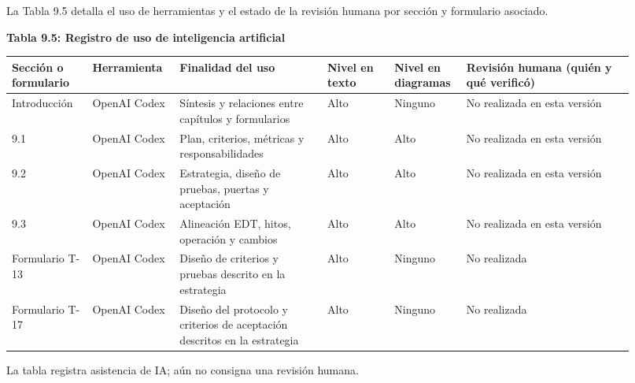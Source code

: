 \documentclass[11pt]{article}
\begin{document}
La Tabla 9.5 detalla el uso de herramientas y el estado de la revisión humana por sección y formulario asociado.

\textbf{Tabla 9.5: Registro de uso de inteligencia artificial}

\begin{longtable}{p{0.12\linewidth}p{0.13\linewidth}p{0.22\linewidth}p{0.10\linewidth}p{0.10\linewidth}p{0.25\linewidth}}
\toprule
Sección o formulario & Herramienta & Finalidad del uso & Nivel en texto & Nivel en diagramas & Revisión humana (quién y qué verificó) \\
\midrule
\endhead
Introducción & OpenAI Codex & Síntesis y relaciones entre capítulos y formularios & Alto & Ninguno & No realizada en esta versión \\
9.1 & OpenAI Codex & Plan, criterios, métricas y responsabilidades & Alto & Alto & No realizada en esta versión \\
9.2 & OpenAI Codex & Estrategia, diseño de pruebas, puertas y aceptación & Alto & Alto & No realizada en esta versión \\
9.3 & OpenAI Codex & Alineación EDT, hitos, operación y cambios & Alto & Alto & No realizada en esta versión \\
Formulario T-13 & OpenAI Codex & Diseño de criterios y pruebas descrito en la estrategia & Alto & Ninguno & No realizada \\
Formulario T-17 & OpenAI Codex & Diseño del protocolo y criterios de aceptación descritos en la estrategia & Alto & Ninguno & No realizada \\
\bottomrule
\end{longtable}

La tabla registra asistencia de IA; aún no consigna una revisión humana.

\ossFinalPage
\end{document}
